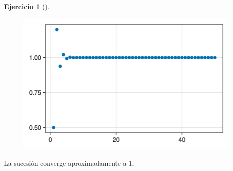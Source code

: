\documentclass[
  a4paper,
]{scrreport}
\theoremstyle{definition}
\newtheorem{exercise}{Ejercicio}[chapter]
\theoremstyle{remark}
\begin{document}
\begin{exercise}[]
\begin{tcolorbox}
\begin{figure}[H]
{\centering \includegraphics{02-sucesiones_files/figure-pdf/cell-16-output-1.png}

}

\end{figure}

La sucesión converge aproximadamente a \(1\).

\end{tcolorbox}

\end{exercise}
\end{document}
